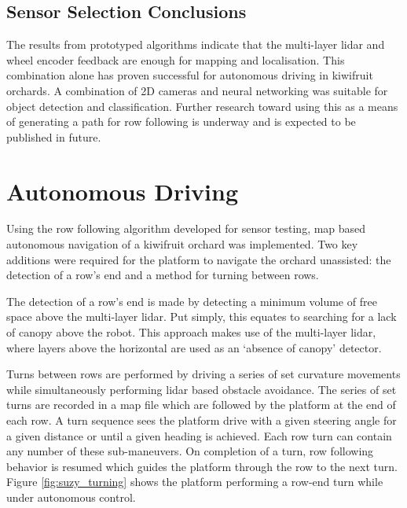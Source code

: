 \documentclass[preprint,authoryear,12pt]{elsarticle}
\begin{document}
\subsection{Sensor Selection Conclusions}
    The results from prototyped algorithms indicate that the multi-layer lidar and wheel encoder feedback are enough for mapping and localisation.
    This combination alone has proven successful for autonomous driving in kiwifruit orchards.
    A combination of 2D cameras and neural networking was suitable for object detection and classification.
    Further research toward using this as a means of generating a path for row following is underway and is expected to be published in future.



\section{Autonomous Driving}
\label{sect:autonomous}
    Using the row following algorithm developed for sensor testing, map based autonomous navigation of a kiwifruit orchard was implemented.
    Two key additions were required for the platform to navigate the orchard unassisted: the detection of a row's end and a method for turning between rows.

    The detection of a row's end is made by detecting a minimum volume of free space above the multi-layer lidar.
    Put simply, this equates to searching for a lack of canopy above the robot.
    This approach makes use of the multi-layer lidar, where layers above the horizontal are used as an `absence of canopy' detector.

    Turns between rows are performed by driving a series of set curvature movements while simultaneously performing lidar based obstacle avoidance.
    The series of set turns are recorded in a map file which are followed by the platform at the end of each row.
    A turn sequence sees the platform drive with a given steering angle for a given distance or until a given heading is achieved.
    Each row turn can contain any number of these sub-maneuvers.
    On completion of a turn, row following behavior is resumed which guides the platform through the row to the next turn.
    Figure \ref{fig:suzy_turning} shows the platform performing a row-end turn while under autonomous control.
\end{document}
